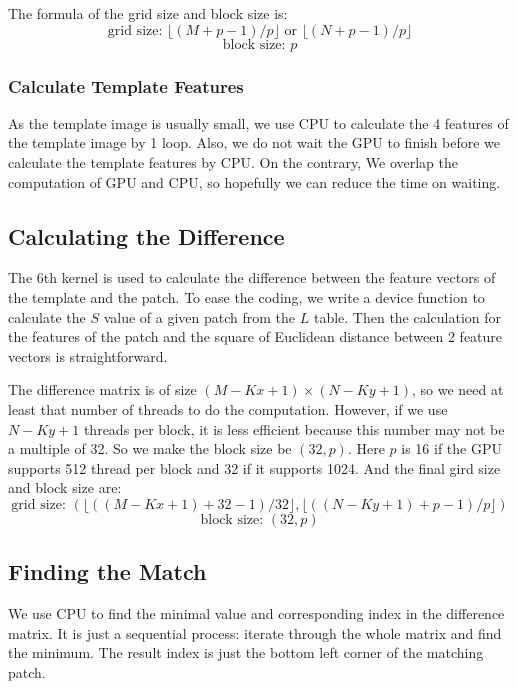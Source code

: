 \documentclass[12pt, a4paper]{article}
\begin{document}
      The formula of the grid size and block size is:
      \[\text{grid size: }\lfloor(M+p-1)/p\rfloor\text{ or }\lfloor(N+p-1)/p\rfloor\]
      \[\text{block size: }p\]

    \subsubsection{Calculate Template Features}
      As the template image is usually small, we use CPU to calculate the 4
      features of the template image by 1 loop. Also, we do not wait the GPU
      to finish before we calculate the template features by CPU. On the contrary,
      We overlap the computation of GPU and CPU, so hopefully we can reduce the
      time on waiting.

  \subsection{Calculating the Difference}
    The 6th kernel is used to calculate the difference between the feature vectors
    of the template and the patch. To ease the coding, we write a
    device function to calculate the $S$ value of a given patch from the $L$
    table. Then the calculation for the features of the patch and the square of
    Euclidean distance between 2 feature vectors is straightforward.

    The difference matrix is of size $(M-Kx+1)\times(N-Ky+1)$, so we need at least
    that number of threads to do the computation. However, if we use $N-Ky+1$
    threads per block, it is less efficient because this number may not be a
    multiple of 32. So we make the block size be $(32, p)$. Here $p$ is 16 if
    the GPU supports 512 thread per block and 32 if it supports 1024. And the
    final gird size and block size are:
    \[\text{grid size: }(\lfloor((M-Kx+1)+32-1)/32\rfloor, \lfloor((N-Ky+1)+p-1)/p\rfloor)\]
    \[\text{block size: }(32, p)\]
  \subsection{Finding the Match}
    We use CPU to find the minimal value and corresponding index in the difference
    matrix. It is just a sequential process: iterate through the whole matrix
    and find the minimum. The result index is just the bottom left corner of the
    matching patch.
\end{document}
